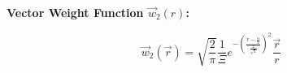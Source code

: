 \documentclass[letterpaper,twocolumn,amsmath,amssymb,prb]{revtex4-1}
\begin{document}
\begin{widetext}
\noindent\textbf{Vector Weight Function $\vec{w}_2(r)$:}

\begin{equation}{\vec{w}_2(\vec{r})=\sqrt{\frac{2}{\pi}}\frac{1}{\Xi}e^{-\left(\frac{r-\frac{\alpha}{2}}{\frac{\Xi}{\sqrt{2}}}\right)^2}\frac{\vec{r}}{r}}\end{equation}



\end{widetext}
\end{document}
